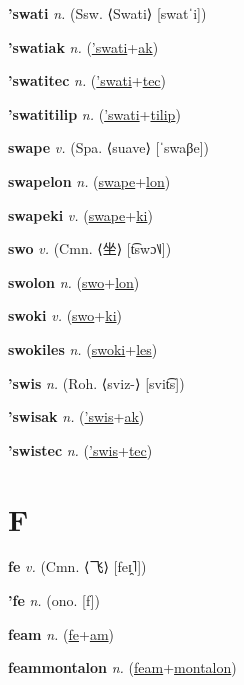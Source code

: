 \textbf{\hypertarget{'swati}{'swati}} \textit{n.} (Ssw. ⟨Swati⟩ [swatˈi])


\textbf{\hypertarget{'swatiak}{'swatiak}} \textit{n.} (\hyperlink{'swati}{'swati}+\allowbreak \hyperlink{ak}{ak})


\textbf{\hypertarget{'swatitec}{'swatitec}} \textit{n.} (\hyperlink{'swati}{'swati}+\allowbreak \hyperlink{tec}{tec})


\textbf{\hypertarget{'swatitilip}{'swatitilip}} \textit{n.} (\hyperlink{'swati}{'swati}+\allowbreak \hyperlink{tilip}{tilip})


\textbf{\hypertarget{swape}{swape}} \textit{v.} (Spa. ⟨suave⟩ [ˈswaβe])


\textbf{\hypertarget{swapelon}{swapelon}} \textit{n.} (\hyperlink{swape}{swape}+\allowbreak \hyperlink{lon}{lon})


\textbf{\hypertarget{swapeki}{swapeki}} \textit{v.} (\hyperlink{swape}{swape}+\allowbreak \hyperlink{ki}{ki})


\textbf{\hypertarget{swo}{swo}} \textit{v.} (Cmn. ⟨{\chinese{}坐}⟩ [t͡swɔ˥˩])


\textbf{\hypertarget{swolon}{swolon}} \textit{n.} (\hyperlink{swo}{swo}+\allowbreak \hyperlink{lon}{lon})


\textbf{\hypertarget{swoki}{swoki}} \textit{v.} (\hyperlink{swo}{swo}+\allowbreak \hyperlink{ki}{ki})


\textbf{\hypertarget{swokiles}{swokiles}} \textit{n.} (\hyperlink{swoki}{swoki}+\allowbreak \hyperlink{les}{les})


\textbf{\hypertarget{'swis}{'swis}} \textit{n.} (Roh. ⟨sviz-⟩ [svit͡s])


\textbf{\hypertarget{'swisak}{'swisak}} \textit{n.} (\hyperlink{'swis}{'swis}+\allowbreak \hyperlink{ak}{ak})


\textbf{\hypertarget{'swistec}{'swistec}} \textit{n.} (\hyperlink{'swis}{'swis}+\allowbreak \hyperlink{tec}{tec})


\section{F}

\textbf{\hypertarget{fe}{fe}} \textit{v.} (Cmn. ⟨{\chinese{}飞}⟩ [feɪ̯˥])


\textbf{\hypertarget{'fe}{'fe}} \textit{n.} (ono. [f])


\textbf{\hypertarget{feam}{feam}} \textit{n.} (\hyperlink{fe}{fe}+\allowbreak \hyperlink{am}{am})


\textbf{\hypertarget{feammontalon}{feammontalon}} \textit{n.} (\hyperlink{feam}{feam}+\allowbreak \hyperlink{montalon}{montalon})


